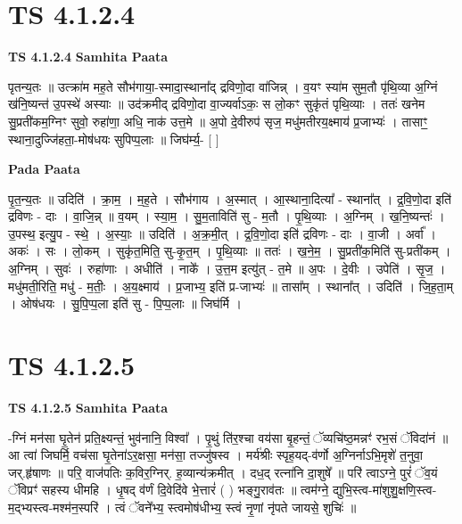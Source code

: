\documentclass[17pt]{extarticle}
\begin{document}
\section*{ TS 4.1.2.4 }

\textbf{TS 4.1.2.4 } \newline
\textbf{Samhita Paata} \newline

पृतन्य॒तः ॥ उत्क्रा॑म मह॒ते सौभ॑गाया॒-स्मादा॒स्थाना᳚द् द्रविणो॒दा वा॑जिन्न् । व॒यꣳ स्या॑म सुम॒तौ पृ॑थि॒व्या अ॒ग्निं ख॑नि॒ष्यन्त॑ उ॒पस्थे॑ अस्याः ॥ उद॑क्रमीद् द्रविणो॒दा वा॒ज्यर्वाऽकः॒ स लो॒कꣳ सुकृ॑तं पृथि॒व्याः । ततः॑ खनेम सु॒प्रती॑कम॒ग्निꣳ सुवो॒ रुहा॑णा॒ अधि॒ नाक॑ उत्त॒मे ॥ अ॒पो दे॒वीरुप॑ सृज॒ मधु॑मतीरय॒क्ष्माय॑ प्र॒जाभ्यः॑ । तासाꣳ॒॒ स्थाना॒दुज्जि॑हता॒-मोष॑धयः सुपिप्प॒लाः ॥ जिघ॑र्म्य॒- [  ] \newline

\textbf{Pada Paata} \newline

पृ॒त॒न्य॒तः ॥ उदिति॑ । क्रा॒म॒ । म॒ह॒ते । सौभ॑गाय । अ॒स्मात् । आ॒स्थाना॒दित्या᳚ - स्थाना᳚त् । द्र॒वि॒णो॒दा इति॑ द्रविणः - दाः । वा॒जि॒न्न् ॥ व॒यम् । स्या॒म॒ । सु॒म॒ताविति॑ सु - म॒तौ । पृ॒थि॒व्याः । अ॒ग्निम् । ख॒नि॒ष्यन्तः॑ । उ॒पस्थ॒ इत्यु॒प - स्थे॒ । अ॒स्याः॒ ॥ उदिति॑ । अ॒क्र॒मी॒त् । द्र॒वि॒णो॒दा इति॑ द्रविणः - दाः । वा॒जी । अर्वा᳚ । अकः॑ । सः । लो॒कम् । सुकृ॑त॒मिति॒ सु-कृ॒त॒म् । पृ॒थि॒व्याः ॥ ततः॑ । ख॒ने॒म॒ । सु॒प्रती॑क॒मिति॑ सु-प्रती॑कम् । अ॒ग्निम् । सुवः॑ । रुहा॑णाः । अधीति॑ । नाके᳚ । उ॒त्त॒म इत्यु॑त् - त॒मे ॥ अ॒पः । दे॒वीः । उपेति॑ । सृ॒ज॒ । मधु॑मती॒रिति॒ मधु॑ - म॒तीः॒ । अ॒य॒क्ष्माय॑ । प्र॒जाभ्य॒ इति॑ प्र-जाभ्यः॑ ॥ तासा᳚म् । स्थाना᳚त् । उदिति॑ । जि॒ह॒ता॒म् । ओष॑धयः । सु॒पि॒प्प॒ला इति॑ सु - पि॒प्प॒लाः ॥ जिघ॑र्मि ।  \newline




\section*{ TS 4.1.2.5 }

\textbf{TS 4.1.2.5 } \newline
\textbf{Samhita Paata} \newline

-ग्निं मन॑सा घृ॒तेन॑ प्रति॒क्ष्यन्तं॒ भुव॑नानि॒ विश्वा᳚ । पृ॒थुं ति॑र॒श्चा वय॑सा बृ॒हन्तं॒ ॅव्यचि॑ष्ठ॒मन्नꣳ॑ रभ॒सं ॅविदा॑नं ॥ आ त्वा॑ जिघर्मि॒ वच॑सा घृ॒तेना॑ऽर॒क्षसा॒ मन॑सा॒ तज्जु॑षस्व । मर्य॑श्रीः स्पृह॒यद्-व॑र्णो अ॒ग्निर्नाऽभि॒मृशे॑ त॒नुवा॒ जर्.हृ॑षाणः ॥ परि॒ वाज॑पतिः क॒विर॒ग्निर्. ह॒व्यान्य॑क्रमीत् । दध॒द् रत्ना॑नि दा॒शुषे᳚ ॥ परि॑ त्वाऽग्ने॒ पुरं॑ ॅव॒यं ॅविप्रꣳ॑ सहस्य धीमहि । धृ॒षद् व॑र्णं दि॒वेदि॑वे भे॒त्तारं॑ ( ) भङ्गु॒राव॑तः ॥ त्वम॑ग्ने॒ द्युभि॒स्त्व-मा॑शुशु॒क्षणि॒स्त्व-म॒द्भ्यस्त्व-मश्म॑न॒स्परि॑ । त्वं ॅवने᳚भ्य॒ स्त्वमोष॑धीभ्य॒ स्त्वं नृ॒णां नृ॑पते जायसे॒ शुचिः॑ ॥ \newline
\end{document}
